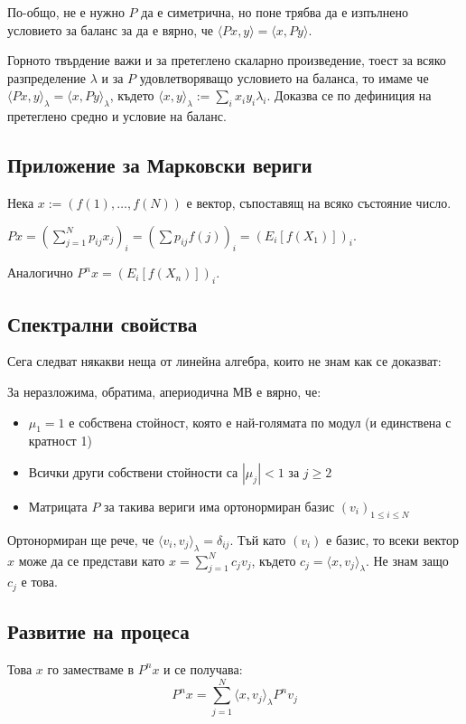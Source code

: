 \documentclass{article}
\begin{document}
По-общо, не е нужно $P$ да е симетрична, но поне трябва да е изпълнено условието за баланс за да е вярно, че $\langle Px,y \rangle = \langle x,Py \rangle$.

Горното твърдение важи и за претеглено скаларно произведение, тоест за всяко разпределение $\lambda$ и за $P$ удовлетворяващо условието на баланса, то имаме че $\langle Px,y \rangle_\lambda = \langle x,Py \rangle_\lambda$, където $\langle x,y \rangle_\lambda := \sum_{i} x_i y_i \lambda_i$. Доказва се по дефиниция на претеглено средно и условие на баланс.

\subsection{Приложение за Марковски вериги}
Нека $x := (f(1),\dots,f(N))$ е вектор, съпоставящ на всяко състояние число.

$Px = \left( \sum_{j=1}^N p_{ij} x_j \right)_i = \left( \sum p_{ij} f(j) \right)_i = \left( E_i[f(X_1)] \right)_i$.

Аналогично $P^n x = \left( E_i[f(X_n)] \right)_i$.

\subsection{Спектрални свойства}
Сега следват някакви неща от линейна алгебра, които не знам как се доказват:

За неразложима, обратима, апериодична МВ е вярно, че:
\begin{itemize}
\item $\mu_1=1$ е собствена стойност, която е най-голямата по модул (и единствена с кратност 1)
\item Всички други собствени стойности са $|\mu_j|<1$ за $j\geq2$
\item Матрицата $P$ за такива вериги има ортонормиран базис $(v_i)_{1\leq i\leq N}$
\end{itemize}

Ортонормиран ще рече, че $\langle v_i,v_j \rangle_\lambda = \delta_{ij}$. Тъй като $(v_i)$ е базис, то всеки вектор $x$ може да се представи като $x = \sum_{j=1}^N c_j v_j$, където $c_j = \langle x,v_j \rangle_\lambda$. Не знам защо $c_j$ е това.

\subsection{Развитие на процеса}
Това $x$ го заместваме в $P^n x$ и се получава:
$$P^n x = \sum_{j=1}^N \langle x,v_j \rangle_\lambda P^n v_j$$
\end{document}
